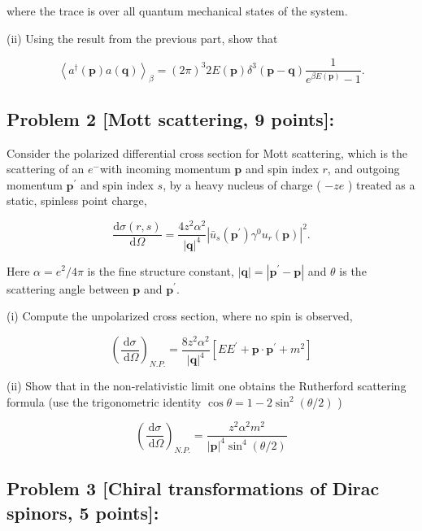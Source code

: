 \documentclass[10pt, letterpaper]{article}
\begin{document}
where the trace is over all quantum mechanical states of the system.

(ii) Using the result from the previous part, show that

$$
\left\langle a^{\dagger}(\mathbf{p}) a(\mathbf{q})\right\rangle_\beta=(2 \pi)^3 2 E(\mathbf{p}) \delta^3(\mathbf{p}-\mathbf{q}) \frac{1}{e^{\beta E(\mathbf{p})}-1} .
$$





\subsection{Problem 2 [Mott scattering, 9 points]:}

Consider the polarized differential cross section for Mott scattering, which is the scattering of an $e^{-}$with incoming momentum $\mathbf{p}$ and spin index $r$, and outgoing momentum $\mathbf{p}^{\prime}$ and spin index $s$, by a heavy nucleus of charge ( $-z e$ ) treated as a static, spinless point charge,

$$
\frac{\mathrm{d} \sigma(r, s)}{\mathrm{d} \Omega}=\frac{4 z^2 \alpha^2}{|\mathbf{q}|^4}\left|\bar{u}_s\left(\mathbf{p}^{\prime}\right) \gamma^0 u_r(\mathbf{p})\right|^2 .
$$

Here $\alpha=e^2 / 4 \pi$ is the fine structure constant, $|\mathbf{q}|=\left|\mathbf{p}^{\prime}-\mathbf{p}\right|$ and $\theta$ is the scattering angle between $\mathbf{p}$ and $\mathbf{p}^{\prime}$.

(i) Compute the unpolarized cross section, where no spin is observed,

$$
\left(\frac{\mathrm{d} \sigma}{\mathrm{~d} \Omega}\right)_{N . P .}=\frac{8 z^2 \alpha^2}{|\mathbf{q}|^4}\left[E E^{\prime}+\mathbf{p} \cdot \mathbf{p}^{\prime}+m^2\right]
$$

(ii) Show that in the non-relativistic limit one obtains the Rutherford scattering formula (use the trigonometric identity $\cos \theta=1-2 \sin ^2(\theta / 2)$ )

$$
\left(\frac{\mathrm{d} \sigma}{\mathrm{~d} \Omega}\right)_{N . P .}=\frac{z^2 \alpha^2 m^2}{|\mathbf{p}|^4 \sin ^4(\theta / 2)}
$$




\subsection{Problem 3 [Chiral transformations of Dirac spinors, 5 points]:}
\end{document}
